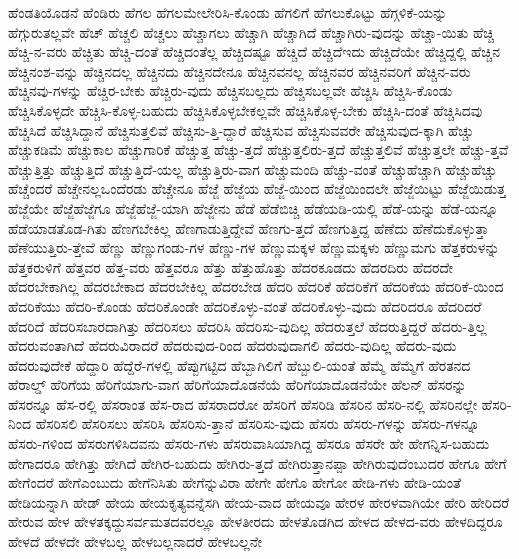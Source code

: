 {ಹೆಂಡತಿಯೊಡನೆ
ಹೆಂಡಿರು
ಹೆಗಲ
ಹೆಗಲಮೇಲೇರಿಸಿ-ಕೊಂಡು
ಹೆಗಲಿಗೆ
ಹೆಗಲುಕೊಟ್ಟು
ಹೆಗ್ಗಳಿಕೆ-ಯನ್ನು
ಹೆಗ್ಗುರುತಲ್ಲವೇ
ಹೆಚ್
ಹೆಚ್ಚಲಿ
ಹೆಚ್ಚಲು
ಹೆಚ್ಚಾಗಲು
ಹೆಚ್ಚಾಗಿ
ಹೆಚ್ಚಾಗಿದೆ
ಹೆಚ್ಚಾಗಿರು-ವುದನ್ನು
ಹೆಚ್ಚಾ-ಯಿತು
ಹೆಚ್ಚಿ
ಹೆಚ್ಚಿ-ನ-ವರು
ಹೆಚ್ಚಿತು
ಹೆಚ್ಚಿ-ದಂತೆ
ಹೆಚ್ಚಿದಂತೆಲ್ಲ
ಹೆಚ್ಚಿದಷ್ಟೂ
ಹೆಚ್ಚಿದೆ
ಹೆಚ್ಚಿದೆಇದು
ಹೆಚ್ಚಿದೆಯೇ
ಹೆಚ್ಚಿದ್ದಲ್ಲಿ
ಹೆಚ್ಚಿನ
ಹೆಚ್ಚಿನಂಶ-ವನ್ನು
ಹೆಚ್ಚಿನದಲ್ಲ
ಹೆಚ್ಚಿನದು
ಹೆಚ್ಚಿನದೇನೂ
ಹೆಚ್ಚಿನವನಲ್ಲ
ಹೆಚ್ಚಿನವರ
ಹೆಚ್ಚಿನವರಿಗೆ
ಹೆಚ್ಚಿನ-ವರು
ಹೆಚ್ಚಿನವು-ಗಳನ್ನು
ಹೆಚ್ಚಿರ-ಬೇಕು
ಹೆಚ್ಚಿರು-ವುದು
ಹೆಚ್ಚಿಸಬಲ್ಲದು
ಹೆಚ್ಚಿಸಬಲ್ಲವೇ
ಹೆಚ್ಚಿಸಿ
ಹೆಚ್ಚಿಸಿ-ಕೊಂಡು
ಹೆಚ್ಚಿಸಿಕೊಳ್ಳದೇ
ಹೆಚ್ಚಿಸಿ-ಕೊಳ್ಳ-ಬಹುದು
ಹೆಚ್ಚಿಸಿಕೊಳ್ಳಬೇಕಲ್ಲವೇ
ಹೆಚ್ಚಿಸಿಕೊಳ್ಳ-ಬೇಕು
ಹೆಚ್ಚಿಸಿ-ದಂತೆ
ಹೆಚ್ಚಿಸಿದವು
ಹೆಚ್ಚಿಸಿದೆ
ಹೆಚ್ಚಿಸಿದ್ದಾನೆ
ಹೆಚ್ಚಿಸುತ್ತಲಿವೆ
ಹೆಚ್ಚಿಸು-ತ್ತಿ-ದ್ದಾರೆ
ಹೆಚ್ಚಿಸುವ
ಹೆಚ್ಚಿಸುವವರೇ
ಹೆಚ್ಚಿಸುವುದ-ಕ್ಕಾಗಿ
ಹೆಚ್ಚು
ಹೆಚ್ಚುಕಡಿಮೆ
ಹೆಚ್ಚುಕಾಲ
ಹೆಚ್ಚುಗಾರಿಕೆ
ಹೆಚ್ಚುತ್ತ
ಹೆಚ್ಚು-ತ್ತದೆ
ಹೆಚ್ಚುತ್ತಲಿರು-ತ್ತದೆ
ಹೆಚ್ಚುತ್ತಲಿವೆ
ಹೆಚ್ಚುತ್ತಲೇ
ಹೆಚ್ಚು-ತ್ತವೆ
ಹೆಚ್ಚುತ್ತಿತ್ತು
ಹೆಚ್ಚುತ್ತಿದೆ
ಹೆಚ್ಚುತ್ತಿದೆ-ಯಲ್ಲ
ಹೆಚ್ಚುತ್ತಿರು-ವಾಗ
ಹೆಚ್ಚುಮಂದಿ
ಹೆಚ್ಚು-ವಂತೆ
ಹೆಚ್ಚುಹೆಚ್ಚಾಗಿ
ಹೆಚ್ಚುಹೆಚ್ಚು
ಹೆಚ್ಚೆಂದರೆ
ಹೆಚ್ಚೇನಲ್ಲಒಂದೆರಡು
ಹೆಚ್ಚೇನೂ
ಹೆಜ್ಜೆ
ಹೆಜ್ಜೆಯ
ಹೆಜ್ಜೆ-ಯಿಂದ
ಹೆಜ್ಜೆಯಿಂದಲೇ
ಹೆಜ್ಜೆಯಿಟ್ಟು
ಹೆಜ್ಜೆಯಿಡುತ್ತ
ಹೆಜ್ಜೆಯೇ
ಹೆಜ್ಜೆಹೆಜ್ಜೆಗೂ
ಹೆಜ್ಜೆಹೆಜ್ಜೆ-ಯಾಗಿ
ಹೆಜ್ಜೇನು
ಹೆಡೆ
ಹೆಡೆಬಿಚ್ಚಿ
ಹೆಡೆಯಡಿ-ಯಲ್ಲಿ
ಹೆಡೆ-ಯನ್ನು
ಹೆಡೆ-ಯನ್ನೂ
ಹೆಡೆಯಾಡತೊಡ-ಗಿತು
ಹೆಣಗಬೇಕಿಲ್ಲ
ಹೆಣಗಾಡುತ್ತಿದ್ದೇವೆ
ಹೆಣಗು-ತ್ತದೆ
ಹೆಣಗುತ್ತಿದ್ದ
ಹೆಣೆದು
ಹೆಣೆದುಕೊಳ್ಳುತ್ತಾ
ಹೆಣೆಯುತ್ತಿರು-ತ್ತೇವೆ
ಹೆಣ್ಣು
ಹೆಣ್ಣುಗಂಡು-ಗಳ
ಹೆಣ್ಣು-ಗಳ
ಹೆಣ್ಣುಮಕ್ಕಳ
ಹೆಣ್ಣುಮಕ್ಕಳು
ಹೆಣ್ಣುಮಗು
ಹೆತ್ತಕರುಳನ್ನು
ಹೆತ್ತಕರುಳಿಗೆ
ಹೆತ್ತವರ
ಹೆತ್ತ-ವರು
ಹೆತ್ತವರೂ
ಹೆತ್ತು
ಹೆತ್ತುಹೊತ್ತು
ಹೆದರಕೂಡದು
ಹೆದರದಿರು
ಹೆದರದೇ
ಹೆದರಬೇಕಾಗಿಲ್ಲ
ಹೆದರಬೇಕಾದ
ಹೆದರಬೇಕಿಲ್ಲ
ಹೆದರಬೇಡ
ಹೆದರಿ
ಹೆದರಿಕೆ
ಹೆದರಿಕೆಗೆ
ಹೆದರಿಕೆಯ
ಹೆದರಿಕೆ-ಯಿಂದ
ಹೆದರಿಕೆಯು
ಹೆದರಿ-ಕೊಂಡು
ಹೆದರಿಕೊಂಡೇ
ಹೆದರಿಕೊಳ್ಳು-ವಂತೆ
ಹೆದರಿಕೊಳ್ಳು-ವುದು
ಹೆದರಿದರೂ
ಹೆದರಿದರೆ
ಹೆದರಿದೆ
ಹೆದರಿಸಬಾರದಾಗಿತ್ತು
ಹೆದರಿಸಲು
ಹೆದರಿಸಿ
ಹೆದರಿಸು-ವುದಿಲ್ಲ
ಹೆದರುತ್ತಲೆ
ಹೆದರುತ್ತಿದ್ದರೆ
ಹೆದರು-ತ್ತಿಲ್ಲ
ಹೆದರುವಂತಾಗಿದೆ
ಹೆದರುವಿರಾದರೆ
ಹೆದರುವುದ-ರಿಂದ
ಹೆದರುವುದಾಗಲಿ
ಹೆದರು-ವುದಿಲ್ಲ
ಹೆದರು-ವುದು
ಹೆದರುವುದೇಕೆ
ಹೆದ್ದಾರಿ
ಹೆದ್ದೆರೆ-ಗಳಲ್ಲಿ
ಹೆಪ್ಪುಗಟ್ಟಿದ
ಹೆಬ್ಬಾಗಿಲಿಗೆ
ಹೆಬ್ಬುಲಿ-ಯಂತೆ
ಹೆಮ್ಮೆ
ಹೆಮ್ಮೆಗೆ
ಹೆರತನದ
ಹೆರಾಲ್ಡ್
ಹೆರಿಗೆಯ
ಹೆರಿಗೆಯಾಗು-ವಾಗ
ಹೆರಿಗೆಯಾದೊಡನೆಯೆ
ಹೆರಿಗೆಯಾದೊಡನೆಯೇ
ಹೆಲನ್
ಹೆಸರನ್ನು
ಹೆಸರನ್ನೂ
ಹೆಸ-ರಲ್ಲಿ
ಹೆಸರಾಂತ
ಹೆಸ-ರಾದ
ಹೆಸರಾದರೋ
ಹೆಸರಿಗೆ
ಹೆಸರಿಡಿ
ಹೆಸರಿನ
ಹೆಸರಿ-ನಲ್ಲಿ
ಹೆಸರಿನಲ್ಲೇ
ಹೆಸರಿ-ನಿಂದ
ಹೆಸರಿಸಲಿ
ಹೆಸರಿಸಲು
ಹೆಸರಿಸಿ
ಹೆಸರಿಸು-ತ್ತಾನೆ
ಹೆಸರಿಸು-ವುದು
ಹೆಸರು
ಹೆಸರು-ಗಳನ್ನು
ಹೆಸರು-ಗಳನ್ನೂ
ಹೆಸರು-ಗಳಿಂದ
ಹೆಸರುಗಳಿಸಿದವನು
ಹೆಸರು-ಗಳು
ಹೆಸರುವಾಸಿಯಾಗಿದ್ದ
ಹೆಸರೂ
ಹೆಸರೇ
ಹೇ
ಹೇಗನ್ನಿಸ-ಬಹುದು
ಹೇಗಾದರೂ
ಹೇಗಿತ್ತು
ಹೇಗಿದೆ
ಹೇಗಿರ-ಬಹುದು
ಹೇಗಿರು-ತ್ತದೆ
ಹೇಗಿರುತ್ತಾನಪ್ಪಾ
ಹೇಗಿರುವುದೆಂಬುದರ
ಹೇಗೂ
ಹೇಗೆ
ಹೇಗೆಂದರೆ
ಹೇಗೆಎಂಬುದು
ಹೇಗೆನಿಸಿತು
ಹೇಗೆನ್ನುವಿರಾ
ಹೇಗೇ
ಹೇಗೊ
ಹೇಗೋ
ಹೇಡಿ-ಗಳು
ಹೇಡಿ-ಯಂತೆ
ಹೇಡಿಯನ್ನಾಗಿ
ಹೇಡ್
ಹೇಯ
ಹೇಯಕೃತ್ಯವನ್ನೆಸಗಿ
ಹೇಯ-ವಾದ
ಹೇಯವೂ
ಹೇರಳ
ಹೇರಳವಾಗಿಯೇ
ಹೇರಿ
ಹೇರಿದರೆ
ಹೇರುವ
ಹೇಳ
ಹೇಳತಕ್ಕದ್ದುಸರ್ವಮತದವರಲ್ಲೂ
ಹೇಳತೀರದು
ಹೇಳತೊಡಗಿದ
ಹೇಳದ
ಹೇಳದ-ವರು
ಹೇಳದಿದ್ದರೂ
ಹೇಳದೆ
ಹೇಳದೇ
ಹೇಳಬಲ್ಲ
ಹೇಳಬಲ್ಲನಾದರೆ
ಹೇಳಬಲ್ಲನೇ
}

